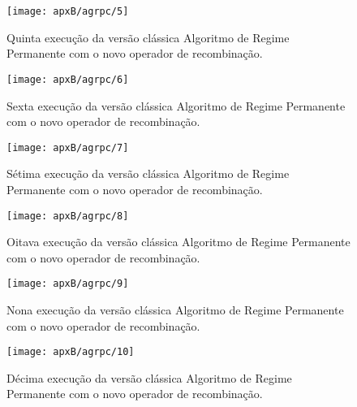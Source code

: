 \begin{figure}[H]
\centering
\texttt{[image: apxB/agrpc/5]}
\caption{Quinta execução da versão clássica Algoritmo de Regime Permanente com o novo operador de recombinação.}
\label{fig:graphRPC2-05}
\end{figure}

\begin{figure}[H]
\centering
\texttt{[image: apxB/agrpc/6]}
\caption{Sexta execução da versão clássica Algoritmo de Regime Permanente com o novo operador de recombinação.}
\label{fig:graphRPC2-06}
\end{figure}

\begin{figure}[H]
\centering
\texttt{[image: apxB/agrpc/7]}
\caption{Sétima execução da versão clássica Algoritmo de Regime Permanente com o novo operador de recombinação.}
\label{fig:graphRPC2-07}
\end{figure}

\begin{figure}[H]
\centering
\texttt{[image: apxB/agrpc/8]}
\caption{Oitava execução da versão clássica Algoritmo de Regime Permanente com o novo operador de recombinação.}
\label{fig:graphRPC2-08}
\end{figure}


\begin{figure}[H]
\centering
\texttt{[image: apxB/agrpc/9]}
\caption{Nona execução da versão clássica Algoritmo de Regime Permanente com o novo operador de recombinação.}
\label{fig:graphRPC2-09}
\end{figure}

\begin{figure}[H]
\centering
\texttt{[image: apxB/agrpc/10]}
\caption{Décima execução da versão clássica Algoritmo de Regime Permanente com o novo operador de recombinação.}
\label{fig:graphRPC2-10}
\end{figure}